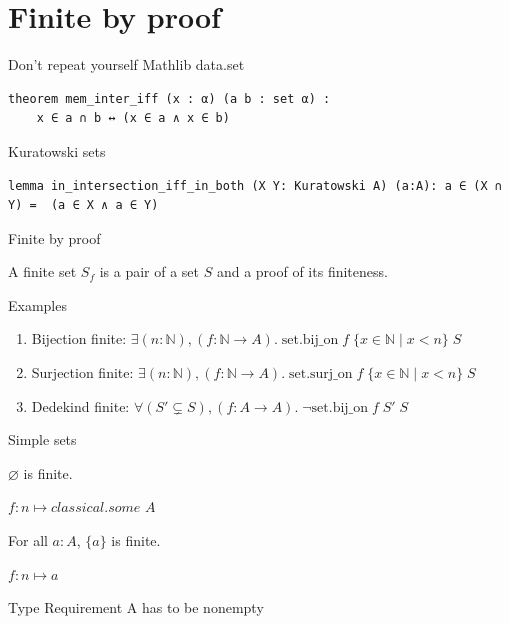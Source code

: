 \documentclass{beamer}
\begin{document}
\section{Finite by proof}
    \begin{frame}[fragile]{Don't repeat yourself}
        Mathlib data.set
        \begin{lstlisting}
theorem mem_inter_iff (x : α) (a b : set α) :
    x ∈ a ∩ b ↔ (x ∈ a ∧ x ∈ b)
        \end{lstlisting}
        Kuratowski sets
        \begin{lstlisting}
lemma in_intersection_iff_in_both (X Y: Kuratowski A) (a:A): a ∈ (X ∩ Y) =  (a ∈ X ∧ a ∈ Y)
        \end{lstlisting}

    \end{frame}
    \begin{frame}{Finite by proof}
        \begin{definition}
            A finite set $S_f$ is a pair of a set $S$ and a proof of its finiteness.
        \end{definition}
        \pause
        Examples
        \begin{enumerate}
            \item Bijection finite: $\exists (n:\mathbb{N}), (f: \mathbb{N} \to A).\; \text{{set.bij\_on}}\; f \;\{ x \in \mathbb{N} \mid x < n\} \;S$
            \item Surjection finite: $\exists (n:\mathbb{N}), (f: \mathbb{N} \to A).\; \text{{set.surj\_on}}\; f \;\{ x \in \mathbb{N} \mid x < n\} \;S $
            \item Dedekind finite: $\forall (S' \subsetneq S), (f: A \to A).\; \neg \text{{set.bij\_on}}\; f\; S'\; S$
        \end{enumerate}
    \end{frame}
    \begin{frame}[fragile]{Simple sets}
        \begin{lemma}
            $ \varnothing $ is finite.
        \end{lemma}
        $f: n \mapsto classical.some $ $A$
        \begin{lemma}
            For all $a:A$, $\{ a\}$ is finite.
        \end{lemma}
        $f: n \mapsto a$
        \begin{block}{Type Requirement}
        A has to be nonempty
        \end{block}
    \end{frame}
\end{document}
